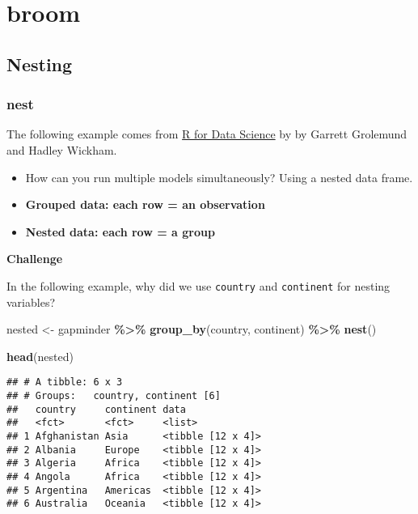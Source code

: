\documentclass[
]{book}
\newenvironment{Shaded}{\begin{snugshade}}{\end{snugshade}}
\newcommand{\KeywordTok}[1]{\textcolor[rgb]{0.13,0.29,0.53}{\textbf{#1}}}
\newcommand{\NormalTok}[1]{#1}
\newcommand{\OperatorTok}[1]{\textcolor[rgb]{0.81,0.36,0.00}{\textbf{#1}}}
\newcommand{\StringTok}[1]{\textcolor[rgb]{0.31,0.60,0.02}{#1}}
\providecommand{\tightlist}{%
  \setlength{\itemsep}{0pt}\setlength{\parskip}{0pt}}
\begin{document}
\hypertarget{broom}{%
\section{broom}\label{broom}}

\hypertarget{nesting}{%
\subsection{Nesting}\label{nesting}}

\hypertarget{nest}{%
\subsubsection{nest}\label{nest}}

The following example comes from \href{https://r4ds.had.co.nz/many-models.html}{R for Data Science} by by Garrett Grolemund and Hadley Wickham.

\begin{itemize}
\tightlist
\item
  How can you run multiple models simultaneously? Using a nested data frame.
\end{itemize}

\begin{itemize}
\item
  \textbf{Grouped data: each row = an observation}
\item
  \textbf{Nested data: each row = a group}
\end{itemize}

\textbf{Challenge}

In the following example, why did we use \texttt{country} and \texttt{continent} for nesting variables?

\begin{Shaded}
\begin{Highlighting}[]
\NormalTok{nested \textless{}{-}}\StringTok{ }\NormalTok{gapminder }\OperatorTok{\%\textgreater{}\%}
\StringTok{  }\KeywordTok{group\_by}\NormalTok{(country, continent) }\OperatorTok{\%\textgreater{}\%}
\StringTok{  }\KeywordTok{nest}\NormalTok{()}

\KeywordTok{head}\NormalTok{(nested)}
\end{Highlighting}
\end{Shaded}

\begin{verbatim}
## # A tibble: 6 x 3
## # Groups:   country, continent [6]
##   country     continent data             
##   <fct>       <fct>     <list>           
## 1 Afghanistan Asia      <tibble [12 x 4]>
## 2 Albania     Europe    <tibble [12 x 4]>
## 3 Algeria     Africa    <tibble [12 x 4]>
## 4 Angola      Africa    <tibble [12 x 4]>
## 5 Argentina   Americas  <tibble [12 x 4]>
## 6 Australia   Oceania   <tibble [12 x 4]>
\end{verbatim}
\end{document}
